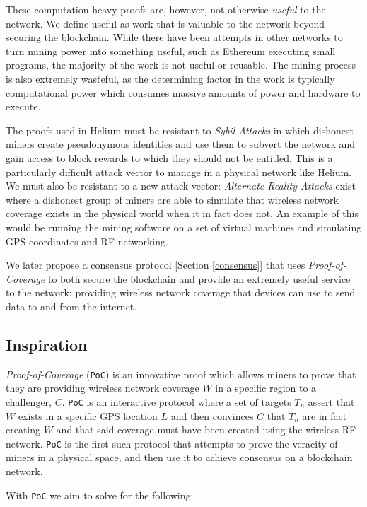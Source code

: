 \documentclass[10pt, nonatbib, nocopyrightspace, reprint]{sigplanconf}
\begin{document}
These computation-heavy proofs are, however, not otherwise \emph{useful} to the network. We define useful as work that is valuable to the network beyond securing the blockchain. While there have been attempts in other networks to turn mining power into something useful, such as Ethereum executing small programs, the majority of the work is not useful or reusable. The mining process is also extremely wasteful, as the determining factor in the work is typically computational power which consumes massive amounts of power and hardware to execute.

The proofs used in Helium must be resistant to \emph{Sybil Attacks} in which dishonest miners create pseudonymous identities and use them to subvert the network and gain access to block rewards to which they should not be entitled. This is a particularly difficult attack vector to manage in a physical network like Helium. We must also be resistant to a new attack vector: \emph{Alternate Reality Attacks} exist where a dishonest group of miners are able to simulate that wireless network coverage exists in the physical world when it in fact does not. An example of this would be running the mining software on a set of virtual machines and simulating GPS coordinates and RF networking.

We later propose a consensus protocol [Section \ref{consensus}] that uses \emph{Proof-of-Coverage} to both secure the blockchain and provide an extremely useful service to the network; providing wireless network coverage that devices can use to send data to and from the internet.

\subsection{Inspiration}

\emph{Proof-of-Coverage} (\verb|PoC|) is an innovative proof which allows miners to prove that they are providing wireless network coverage $W$ in a specific region to a challenger, $C$. \verb|PoC| is an interactive protocol where a set of targets $T_n$ assert that $W$ exists in a specific GPS location $L$ and then convinces $C$ that $T_n$ are in fact creating $W$ and that said coverage must have been created using the wireless RF network. \verb|PoC| is the first such protocol that attempts to prove the veracity of miners in a physical space, and then use it to achieve consensus on a blockchain network.

With \verb|PoC| we aim to solve for the following:
\end{document}
